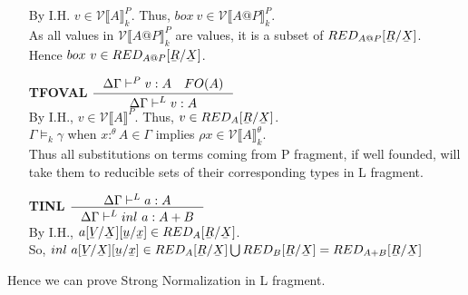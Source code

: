 \documentclass[12pt]{article}
\newcommand{\ub}[1]{\underaccent{\bar}{#1}}
\begin{document}
\begin{itemize}
By I.H. $v \in \mathscr{V}\llbracket A \rrbracket^P_k$. Thus, $box\ v \in \mathscr{V}\llbracket A@P \rrbracket^P_k$.\\
As all values in $\mathscr{V}\llbracket A@P \rrbracket^P_k$ are values, it is a subset of $RED_{A@P}[\ub{R}/\ub{X}]$.\\
Hence $box\ v \in RED_{A@P}[\ub{R}/\ub{X}]$.
\item[\textbf{TFOVAL}]$\inference{\Delta\Gamma \vdash^P v:A \quad FO(A)}{\Delta\Gamma \vdash^L v:A}$\\
By I.H., $v \in \mathscr{V}\llbracket A \rrbracket^P$. Thus, $v \in RED_A[\ub{R}/\ub{X}]$.\\
$\Gamma \vDash_k \gamma$ when $x:^\theta A \in \Gamma$ implies $\rho x \in \mathscr{V}\llbracket A \rrbracket^{\theta}_k$.\\
Thus all substitutions on terms coming from P fragment, if well founded, will take them to reducible sets of their corresponding types in L fragment.\\

\item[\textbf{TINL}]$\inference{\Delta\Gamma \vdash^L a:A}{\Delta\Gamma \vdash^L inl\ a:A+B}$\\
By I.H., $a[\ub{V}/\ub{X}][\ub{u}/\ub{x}] \in RED_A[\ub{R}/\ub{X}]$.\\
So, $inl\ a[\ub{V}/\ub{X}][\ub{u}/\ub{x}] \in RED_A[\ub{R}/\ub{X}] \bigcup RED_B[\ub{R}/\ub{X}] = RED_{A+B}[\ub{R}/\ub{X}] $
\end{itemize}

Hence we can prove Strong Normalization in L fragment.
\end{document}
